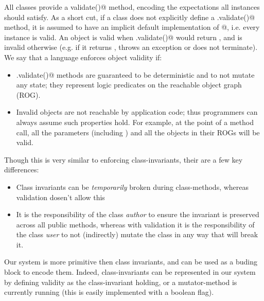 All classes provide a \Q@Bool validate()@ method, encoding the expectations all instances should satisfy.
As a short cut, if a class does not explicitly define a
\Q@.validate()@ method, it is assumed to have an implicit default implementation of @, i.e. every instance is valid.
An object \Q@o@ is valid when \Q@o.validate()@ would return \Q@true@, and is invalid otherwise (e.g. if it returns \Q@false@, throws an exception or does not terminate).
We say that a language enforces object validity if:
\begin{itemize}
\item \Q@.validate()@ methods are guaranteed to be deterministic and to not mutate any state; they represent logic predicates on the reachable object graph (ROG).
\item Invalid objects are not reachable by application code; thus programmers can always assume such properties hold.
For example, at the point of a method call, all the parameters (including \Q@this@) and all the objects in their ROGs will be valid.
\end{itemize}

\noindent Though this is very similar to enforcing class-invariants, their are a few key differences:
\begin{itemize}
\item Class invariants can be \emph{temporarily} broken during class-methods, whereas validation dosen’t allow this
\item It is the responsibility of the class \emph{author} to ensure the invariant is preserved across all public methods, whereas with validation it is the responsibility of the class \emph{user} to not (indirectly) mutate the class in any way that will break it.
\end{itemize}
\noindent Our system is more primitive then class invariants, and can be used as a buding block to encode 
them.
Indeed, class-invariants can be represented in our system by defining validity as 
the class-invariant holding, or a mutator-method is currently running (this is easily implemented with a boolean flag).


